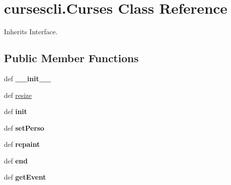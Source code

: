 \hypertarget{classcursescli_1_1_curses}{\section{cursescli.\-Curses \-Class \-Reference}
\label{classcursescli_1_1_curses}
}


\-Inherits \-Interface.

\subsection*{\-Public \-Member \-Functions}
\begin{DoxyCompactItemize}
\item 
\hypertarget{classcursescli_1_1_curses_aca802ada15bbee475c13d3491d70d3c2}{def {\bfseries \-\_\-\-\_\-init\-\_\-\-\_\-}}\label{classcursescli_1_1_curses_aca802ada15bbee475c13d3491d70d3c2}

\item 
def \hyperlink{classcursescli_1_1_curses_ad9de85312537c422b5e6912b132841a1}{resize}
\item 
\hypertarget{classcursescli_1_1_curses_a78fd8f5c0a38c479bd8cb788a42dfda2}{def {\bfseries init}}\label{classcursescli_1_1_curses_a78fd8f5c0a38c479bd8cb788a42dfda2}

\item 
\hypertarget{classcursescli_1_1_curses_ab96bf087eb8f902606ef0b7acc804667}{def {\bfseries set\-Perso}}\label{classcursescli_1_1_curses_ab96bf087eb8f902606ef0b7acc804667}

\item 
\hypertarget{classcursescli_1_1_curses_a5c7bfeb5721045137b5a8fd053086e5f}{def {\bfseries repaint}}\label{classcursescli_1_1_curses_a5c7bfeb5721045137b5a8fd053086e5f}

\item 
\hypertarget{classcursescli_1_1_curses_a63de0dd965494e17ae81e851afb0f1da}{def {\bfseries end}}\label{classcursescli_1_1_curses_a63de0dd965494e17ae81e851afb0f1da}

\item 
\hypertarget{classcursescli_1_1_curses_a1cd106e68483bcbe98d460548bcb3cb8}{def {\bfseries get\-Event}}\label{classcursescli_1_1_curses_a1cd106e68483bcbe98d460548bcb3cb8}

\end{DoxyCompactItemize}
